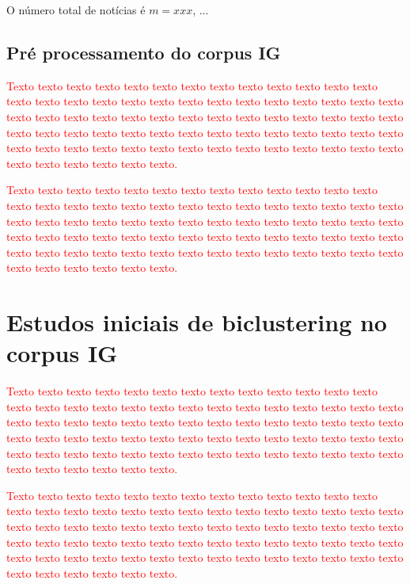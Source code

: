 \documentclass[normaltoc, espacoumemeio, pnumromarab,ruledheader]{abnt}
\begin{document}
O número total de notícias é $m = xxx$, ...

\subsection{Pré processamento do corpus IG}

\textcolor{red}{Texto texto texto texto texto texto texto texto texto texto texto texto texto texto texto texto texto texto texto texto texto texto texto texto texto texto texto texto texto texto texto texto texto texto texto texto texto texto texto texto texto texto texto texto texto texto texto texto texto texto texto texto texto texto texto texto texto texto texto texto texto texto texto texto texto texto texto texto texto texto texto texto texto texto texto.}

\textcolor{red}{Texto texto texto texto texto texto texto texto texto texto texto texto texto texto texto texto texto texto texto texto texto texto texto texto texto texto texto texto texto texto texto texto texto texto texto texto texto texto texto texto texto texto texto texto texto texto texto texto texto texto texto texto texto texto texto texto texto texto texto texto texto texto texto texto texto texto texto texto texto texto texto texto texto texto texto.}

\section{Estudos iniciais de biclustering no corpus IG}

\textcolor{red}{Texto texto texto texto texto texto texto texto texto texto texto texto texto texto texto texto texto texto texto texto texto texto texto texto texto texto texto texto texto texto texto texto texto texto texto texto texto texto texto texto texto texto texto texto texto texto texto texto texto texto texto texto texto texto texto texto texto texto texto texto texto texto texto texto texto texto texto texto texto texto texto texto texto texto texto.}

\textcolor{red}{Texto texto texto texto texto texto texto texto texto texto texto texto texto texto texto texto texto texto texto texto texto texto texto texto texto texto texto texto texto texto texto texto texto texto texto texto texto texto texto texto texto texto texto texto texto texto texto texto texto texto texto texto texto texto texto texto texto texto texto texto texto texto texto texto texto texto texto texto texto texto texto texto texto texto texto.}
\end{document}
